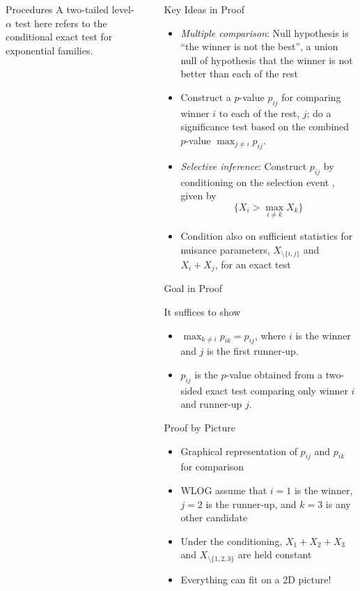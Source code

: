 \documentclass[final]{beamer}
\newlength{\sepwid}
\newlength{\onecolwid}
\begin{document}
\begin{frame}[t]
\begin{columns}[t]
\begin{column}{\onecolwid}
\begin{alertblock}{Procedures}
A two-tailed level-$\alpha$ test here refers to the conditional exact test for exponential families.

\end{alertblock}

\end{column}

\begin{column}{\sepwid}\end{column}

\begin{column}{\onecolwid}

\begin{block}{Key Ideas in Proof}

\begin{itemize}
	\item {\em Multiple comparison}: Null hypothesis is ``the winner is not the best'', a union null of hypothesis that the winner is not better than each of the rest
	\item Construct a $p$-value $p_{ij}$ for comparing winner $i$ to each of the rest, $j$; do a significance test based on the combined $p$-value $\max_{j \ne i} p_{ij}$.
	\item {\em Selective inference}: Construct $p_{ij}$ by conditioning on the selection event \citep{Fithian:2014ws}, given by
	\[
	\{X_i > \max_{i \ne k} X_k\}
	\]
	\item Condition also on sufficient statistics for nuisance parameters, $X_{\setminus\{i, j\}}$ and $X_i + X_j$, for an exact test
\end{itemize}

\end{block}

\begin{alertblock}{Goal in Proof}

It suffices to show
\begin{itemize}
	\item $\max_{k \ne i} p_{ik} = p_{ij}$, where $i$ is the winner and $j$ is the first runner-up.
	\item $p_{ij}$ is the $p$-value obtained from a two-sided exact test comparing only winner $i$ and runner-up $j$.
\end{itemize}

\end{alertblock}

\begin{block}{Proof by Picture}
\begin{itemize}
	\item Graphical representation of $p_{ij}$ and $p_{ik}$ for comparison
	\item WLOG assume that $i = 1$ is the winner, $j = 2$ is the runner-up, and $k = 3$ is any other candidate
	\item Under the conditioning, $X_1 + X_2 + X_3$ and $X_{\setminus\{1, 2, 3\}}$ are held constant
	\item Everything can fit on a 2D picture!
\end{itemize}


\end{block}
\end{column}
\end{columns}
\end{frame}
\end{document}
